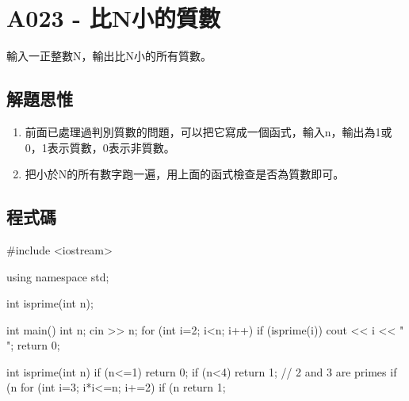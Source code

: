 \section{A023 - 比N小的質數}
輸入一正整數N，輸出比N小的所有質數。

\subsection{解題思惟}
\begin{enumerate}
	\item 前面已處理過判別質數的問題，可以把它寫成一個函式，輸入n，輸出為1或0，1表示質數，0表示非質數。
	\item 把小於N的所有數字跑一遍，用上面的函式檢查是否為質數即可。
\end{enumerate}

\subsection{程式碼}
\begin{cppcode}
#include <iostream>

using namespace std;

int isprime(int n);

int main()
{
	int n;
	cin >> n;
	for (int i=2; i<n; i++) {
		if (isprime(i)) cout << i << " ";
	}
	return 0;
}

int isprime(int n)
{
	if (n<=1) return 0;
	if (n<4) return 1; // 2 and 3 are primes
	if (n%
	for (int i=3; i*i<=n; i+=2) {
		if (n%
	}
	return 1;
}
\end{cppcode}
